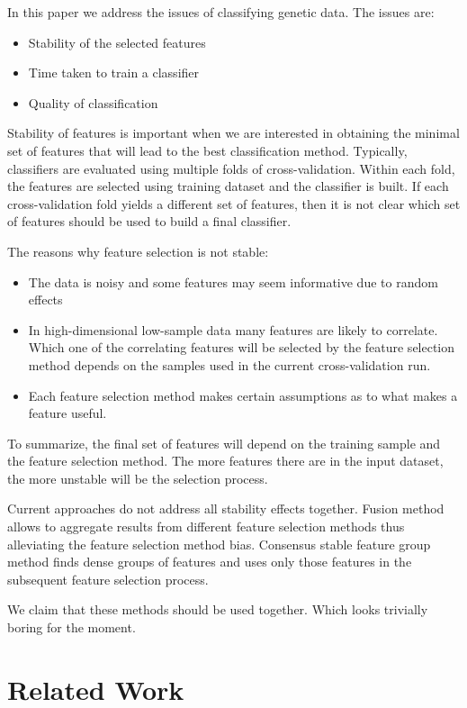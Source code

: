 \documentclass{llncs}
\begin{document}
In this paper we address the issues of classifying genetic data. The issues are:

\begin{itemize}
	\item Stability of the selected features
	\item Time taken to train a classifier
	\item Quality of classification
\end{itemize}


Stability of features is important when we are interested in obtaining the minimal set of features that will lead to the best classification method. Typically, classifiers are evaluated using multiple folds of cross-validation. Within each fold, the features are selected using training dataset and the classifier is built. If each cross-validation fold yields a different set of features, then it is not clear which set of features should be used to build a final classifier.

The reasons why feature selection is not stable:
\begin{itemize}
	\item The data is noisy and some features may seem informative due to random effects
	\item In high-dimensional low-sample data many features are likely to correlate. Which one of the correlating features will be selected by the feature selection method depends on the samples used in the current cross-validation run. 
	\item Each feature selection method makes certain assumptions as to what makes a feature useful. 
\end{itemize}

To summarize, the final set of features will depend on the training sample and the feature selection method. The more features there are in the input dataset, the more unstable will be the selection process.

Current approaches do not address all stability effects together. Fusion method allows to aggregate results from different feature selection methods thus alleviating the feature selection method bias. Consensus stable feature group method finds dense groups of features and uses only those features in the subsequent feature selection process.

We claim that these methods should be used together. Which looks trivially boring for the moment.


\section{Related Work}
\end{document}
